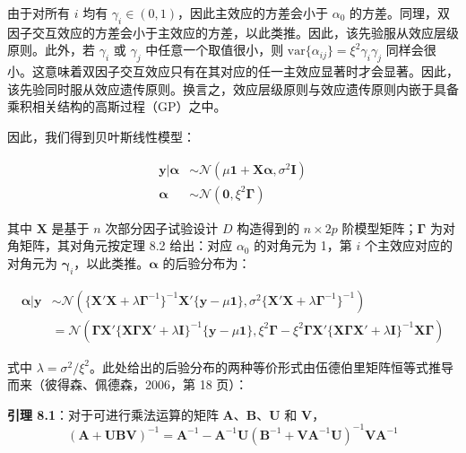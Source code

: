 \documentclass{ctexart}
\begin{document}
由于对所有 $i$ 均有 $\gamma_i \in(0,1)$，因此主效应的方差会小于 $\alpha_0$ 的方差。同理，双因子交互效应的方差会小于主效应的方差，以此类推。因此，该先验服从效应层级原则。此外，若 $\gamma_i$ 或 $\gamma_j$ 中任意一个取值很小，则 $\mathrm{var}\{\alpha_{ij}\}=\xi^2\gamma_i\gamma_j$ 同样会很小。这意味着双因子交互效应只有在其对应的任一主效应显著时才会显著。因此，该先验同时服从效应遗传原则。换言之，效应层级原则与效应遗传原则内嵌于具备乘积相关结构的高斯过程（GP）之中。

因此，我们得到贝叶斯线性模型：

\begin{align*}
\boldsymbol{y}|\boldsymbol{\alpha}&\sim\mathcal{N}(\mu\boldsymbol{1}+\boldsymbol{X}\boldsymbol{\alpha},\sigma^2\boldsymbol{I})\\
\boldsymbol{\alpha}&\sim\mathcal{N}(\boldsymbol{0},\xi^2\boldsymbol{\Gamma})
\end{align*}

其中 $\boldsymbol{X}$ 是基于 $n$ 次部分因子试验设计 $D$ 构造得到的 $n\times2p$ 阶模型矩阵；$\boldsymbol{\Gamma}$ 为对角矩阵，其对角元按定理 8.2 给出：对应 $\alpha_0$ 的对角元为 1，第 $i$ 个主效应对应的对角元为 $\boldsymbol{\gamma}_i$，以此类推。$\boldsymbol{\alpha}$ 的后验分布为：

\begin{align*}
\boldsymbol{\alpha}|\boldsymbol{y}&\sim\mathcal{N}(\{\boldsymbol{X}'\boldsymbol{X}+\lambda\boldsymbol{\Gamma}^{-1}\}^{-1}\boldsymbol{X}'\{\boldsymbol{y}-\mu\boldsymbol{1}\},\sigma^2\{\boldsymbol{X}'\boldsymbol{X}+\lambda\boldsymbol{\Gamma}^{-1}\}^{-1})\\
&=\mathcal{N}(\boldsymbol{\Gamma}\boldsymbol{X}'\{\boldsymbol{X}\boldsymbol{\Gamma}\boldsymbol{X}'+\lambda\boldsymbol{I}\}^{-1}\{\boldsymbol{y}-\mu\boldsymbol{1}\},\xi^2\boldsymbol{\Gamma}-\xi^2\boldsymbol{\Gamma}\boldsymbol{X}'\{\boldsymbol{X}\boldsymbol{\Gamma}\boldsymbol{X}'+\lambda\boldsymbol{I}\}^{-1}\boldsymbol{X}\boldsymbol{\Gamma})
\tag{8.9}
\end{align*}

式中 $\lambda=\sigma^2/\xi^2$。此处给出的后验分布的两种等价形式由伍德伯里矩阵恒等式推导而来（彼得森、佩德森，2006，第 18 页）：

\begin{mdquote}
\textbf{引理 8.1}：对于可进行乘法运算的矩阵 $\boldsymbol{A}$、$\boldsymbol{B}$、$\boldsymbol{U}$ 和 $\boldsymbol{V}$，\begin{equation*}
(\boldsymbol{A}+\boldsymbol{U}\boldsymbol{B}\boldsymbol{V})^{-1}=\boldsymbol{A}^{-1}-\boldsymbol{A}^{-1}\boldsymbol{U}(\boldsymbol{B}^{-1}+\boldsymbol{V}\boldsymbol{A}^{-1}\boldsymbol{U})^{-1}\boldsymbol{V}\boldsymbol{A}^{-1}
\end{equation*}
\end{mdquote}
\end{document}
